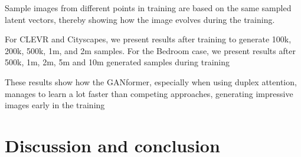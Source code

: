 \documentclass{article}
\begin{document}
	Sample images from different points in training are based on the same sampled latent vectors, 
	thereby showing how the image evolves during the training.
	
	
	For CLEVR and Cityscapes, we present results after training to generate 100k, 200k, 500k, 1m, and 
	2m samples. For the Bedroom case, we present results after 500k, 1m, 2m, 5m and 10m generated 
	samples during training
	
	These results show how the GANformer, especially when using duplex attention, manages to learn a 
	lot faster than competing approaches, generating impressive images early in the training
	
	\section{Discussion and conclusion}%
	
	
	
	
	\clearpage
	
\end{document}
